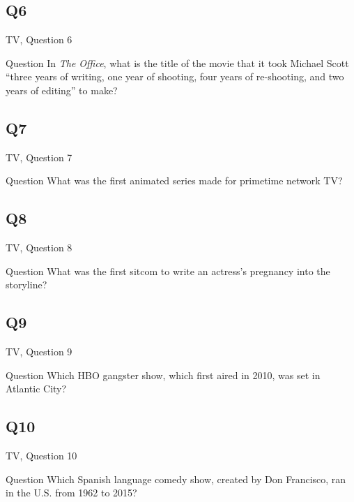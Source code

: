 \documentclass[11pt]{beamer}
\begin{document}
\subsection*{Q6}
\begin{frame}[t]{TV, Question 6}
\begin{block}{Question}
In \emph{The Office}, what is the title of the movie that it took Michael Scott ``three years of writing, one year of shooting, four years of re-shooting, and two years of editing'' to make?
\end{block}
\end{frame}
\subsection*{Q7}
\begin{frame}[t]{TV, Question 7}
\begin{block}{Question}
What was the first animated series made for primetime network TV\@?
\end{block}
\end{frame}
\subsection*{Q8}
\begin{frame}[t]{TV, Question 8}
\begin{block}{Question}
What was the first sitcom to write an actress's pregnancy into the storyline?
\end{block}
\end{frame}
\subsection*{Q9}
\begin{frame}[t]{TV, Question 9}
\begin{block}{Question}
Which HBO gangster show, which first aired in 2010, was set in Atlantic City?
\end{block}
\end{frame}
\subsection*{Q10}
\begin{frame}[t]{TV, Question 10}
\begin{block}{Question}
Which Spanish language comedy show, created by Don Francisco, ran in the U.S. from 1962 to 2015?
\end{block}
\end{frame}
\end{document}
